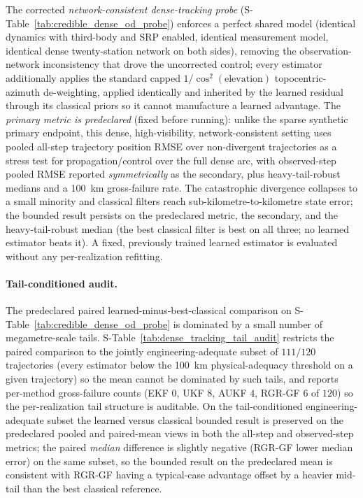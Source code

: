 \documentclass{article}
\begin{document}
The corrected \emph{network-consistent dense-tracking probe} (S-Table~\ref{tab:credible_dense_od_probe}) enforces a perfect shared model (identical dynamics with third-body and SRP enabled, identical measurement model, identical dense twenty-station network on both sides), removing the observation-network inconsistency that drove the uncorrected control; every estimator additionally applies the standard capped $1/\cos^{2}(\mathrm{elevation})$ topocentric-azimuth de-weighting, applied identically and inherited by the learned residual through its classical priors so it cannot manufacture a learned advantage. The \emph{primary metric is predeclared} (fixed before running): unlike the sparse synthetic primary endpoint, this dense, high-visibility, network-consistent setting uses pooled all-step trajectory position RMSE over non-divergent trajectories as a stress test for propagation/control over the full dense arc, with observed-step pooled RMSE reported \emph{symmetrically} as the secondary, plus heavy-tail-robust medians and a 100~km gross-failure rate. The catastrophic divergence collapses to a small minority and classical filters reach sub-kilometre-to-kilometre state error; the bounded result persists on the predeclared metric, the secondary, and the heavy-tail-robust median (the best classical filter is best on all three; no learned estimator beats it). A fixed, previously trained learned estimator is evaluated without any per-realization refitting.

\paragraph{Tail-conditioned audit.}
The predeclared paired learned-minus-best-classical comparison on S-Table~\ref{tab:credible_dense_od_probe} is dominated by a small number of megametre-scale tails. S-Table~\ref{tab:dense_tracking_tail_audit} restricts the paired comparison to the jointly engineering-adequate subset of $111/120$ trajectories (every estimator below the 100~km physical-adequacy threshold on a given trajectory) so the mean cannot be dominated by such tails, and reports per-method gross-failure counts (EKF $0$, UKF $8$, AUKF $4$, RGR-GF $6$ of $120$) so the per-realization tail structure is auditable. On the tail-conditioned engineering-adequate subset the learned versus classical bounded result is preserved on the predeclared pooled and paired-mean views in both the all-step and observed-step metrics; the paired \emph{median} difference is slightly negative (RGR-GF lower median error) on the same subset, so the bounded result on the predeclared mean is consistent with RGR-GF having a typical-case advantage offset by a heavier mid-tail than the best classical reference.
\end{document}

